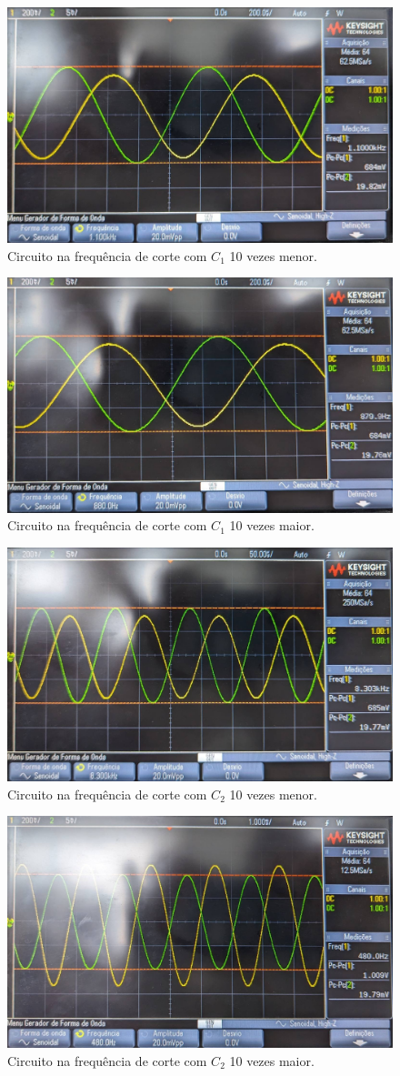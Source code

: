 \begin{figure}[H]
    \centering
    \includegraphics[width=0.5\columnwidth]{Images/freq_corte_C1_baixo.jpeg}
    \caption{Circuito na frequência de corte com $C_1$ 10 vezes menor.}
\end{figure}

\begin{figure}[H]
    \centering
    \includegraphics[width=0.5\columnwidth]{Images/freq_corte_C1_alto.jpeg}
    \caption{Circuito na frequência de corte com $C_1$ 10 vezes maior.}
\end{figure}


\begin{figure}[H]
    \centering
    \includegraphics[width=0.5\columnwidth]{Images/freq_corte_C2_baixo.jpeg}
    \caption{Circuito na frequência de corte com $C_2$ 10 vezes menor.}
\end{figure}

\begin{figure}[H]
    \centering
    \includegraphics[width=0.5\columnwidth]{Images/freq_corte_C2_alto.jpeg}
    \caption{Circuito na frequência de corte com $C_2$ 10 vezes maior.}
\end{figure}


